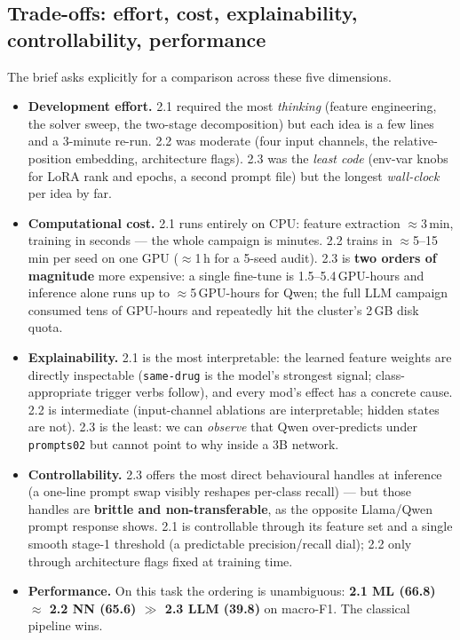 \documentclass[a4paper,11pt]{article}
\begin{document}
\subsection{Trade-offs: effort, cost, explainability, controllability, performance}
The brief asks explicitly for a comparison across these five dimensions.

\begin{itemize}
\item \textbf{Development effort.} 2.1 required the most \emph{thinking}
(feature engineering, the solver sweep, the two-stage decomposition) but
each idea is a few lines and a 3-minute re-run. 2.2 was moderate (four
input channels, the relative-position embedding, architecture flags).
2.3 was the \emph{least code} (env-var knobs for LoRA rank and epochs, a
second prompt file) but the longest \emph{wall-clock} per idea by far.
\item \textbf{Computational cost.} 2.1 runs entirely on CPU: feature
extraction $\approx$3\,min, training in seconds --- the whole campaign
is minutes. 2.2 trains in $\approx$5--15\,min per seed on one GPU
($\approx$1\,h for a 5-seed audit). 2.3 is \textbf{two orders of
magnitude} more expensive: a single fine-tune is 1.5--5.4\,GPU-hours and
inference alone runs up to $\approx$5\,GPU-hours for Qwen; the full LLM
campaign consumed tens of GPU-hours and repeatedly hit the cluster's
2\,GB disk quota.
\item \textbf{Explainability.} 2.1 is the most interpretable: the
learned feature weights are directly inspectable (\texttt{same-drug} is
the model's strongest signal; class-appropriate trigger verbs follow),
and every mod's effect has a concrete cause. 2.2 is intermediate
(input-channel ablations are interpretable; hidden states are not). 2.3
is the least: we can \emph{observe} that Qwen over-predicts under
\texttt{prompts02} but cannot point to why inside a 3B network.
\item \textbf{Controllability.} 2.3 offers the most direct behavioural
handles at inference (a one-line prompt swap visibly reshapes per-class
recall) --- but those handles are \textbf{brittle and non-transferable},
as the opposite Llama/Qwen prompt response shows. 2.1 is controllable
through its feature set and a single smooth stage-1 threshold (a
predictable precision/recall dial); 2.2 only through architecture flags
fixed at training time.
\item \textbf{Performance.} On this task the ordering is unambiguous:
\textbf{2.1 ML (66.8) $\approx$ 2.2 NN (65.6) $\gg$ 2.3 LLM (39.8)} on
macro-F1. The classical pipeline wins.
\end{itemize}
\end{document}
